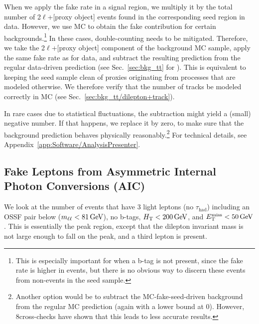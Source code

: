 When we apply the fake rate in a signal region, we multiply it by the total number of 2$\ell$+[proxy object] events found in the corresponding seed region in data. However, we use MC to obtain the fake contribution for certain backgrounds.\footnote{This is especially important for \ttbar when a b-tag is not present, since the fake rate is higher in \ttbar events, but there is no obvious way to discern these events from non-\ttbar events in the seed sample.} In these cases, double-counting needs to be mitigated. Therefore, we take the 2$\ell$+[proxy object] component of the background MC sample, apply the same fake rate as for data, and subtract the resulting prediction from the regular data-driven prediction (see \eg Sec.~\ref{sec:bkg_tt} for \ttbar). This is equivalent to keeping the seed sample clean of proxies originating from processes that are modeled otherwise. We therefore verify that the number of tracks be modeled correctly in MC (see Sec.~\ref{sec:bkg_tt/dilepton+track}).

In rare cases due to statistical fluctuations, the subtraction might yield a (small) negative number. If that happens, we replace it by zero, to make sure that the background prediction behaves physically reasonably.\footnote{Another option would be to subtract the MC-fake-seed-driven background from the regular \ttbar MC prediction (again with a lower bound at 0). However, 8\TeV cross-checks have shown that this leads to less accurate results.} For technical details, see Appendix~\ref{app:Software/AnalysisPresenter}.


\subsection{Fake Leptons from Asymmetric Internal Photon Conversions (AIC)}
\label{sec:bkg_fakeLight/photons}
We look at the number of events that have 3 light leptons (no $\tau_\textrm{had}$) including an OSSF pair below \Z (\ie $m_{\ell\ell} < 81\,\text{Ge\hspace{-.08em}V}$), no b-tags, $H_{\mathrm{T}} < 200\,\text{Ge\hspace{-.08em}V}$, and $E_{\mathrm{T}}^{\text{miss}} < 50\,\text{Ge\hspace{-.08em}V}$. This is essentially the \Z peak region, except that the dilepton invariant mass is not large enough to fall on the \Z peak, and a third lepton is present.

